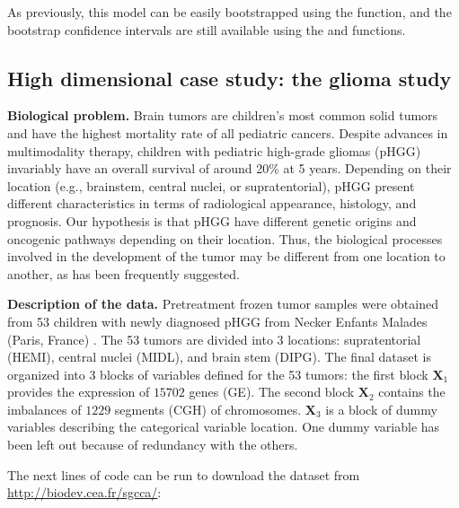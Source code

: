 \documentclass[
]{jss}
\begin{document}
\normalsize

As previously, this model can be easily bootstrapped using the
 function, and the bootstrap confidence
intervals are still available using the  and
 functions.

\subsection{High dimensional case study: the glioma
study}\label{high-dimensional-case-study-the-glioma-study}

\textbf{Biological problem.} Brain tumors are children's most common
solid tumors and have the highest mortality rate of all pediatric
cancers. Despite advances in multimodality therapy, children with
pediatric high-grade gliomas (pHGG) invariably have an overall survival
of around 20\% at 5 years. Depending on their location (e.g., brainstem,
central nuclei, or supratentorial), pHGG present different
characteristics in terms of radiological appearance, histology, and
prognosis. Our hypothesis is that pHGG have different genetic origins
and oncogenic pathways depending on their location. Thus, the biological
processes involved in the development of the tumor may be different from
one location to another, as has been frequently suggested.

\textbf{Description of the data.} Pretreatment frozen tumor samples were
obtained from 53 children with newly diagnosed pHGG from Necker Enfants
Malades (Paris, France) \citep{Puget2012}. The 53 tumors are divided
into 3 locations: supratentorial (HEMI), central nuclei (MIDL), and
brain stem (DIPG). The final dataset is organized into 3 blocks of
variables defined for the 53 tumors: the first block \(\mathbf{X}_1\)
provides the expression of \(15702\) genes (GE). The second block
\(\mathbf{X}_2\) contains the imbalances of \(1229\) segments (CGH) of
chromosomes. \(\mathbf{X}_3\) is a block of dummy variables describing
the categorical variable location. One dummy variable has been left out
because of redundancy with the others.

The next lines of code can be run to download the dataset from
\url{http://biodev.cea.fr/sgcca/}:

\footnotesize

\begin{CodeChunk}
\end{CodeChunk}
\end{document}
